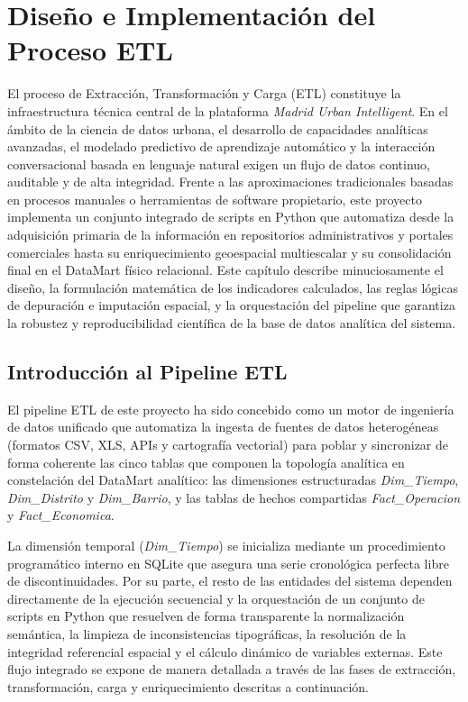\documentclass[a4paper,11pt,openany]{book}
\begin{document}
\chapter{Diseño e Implementación del Proceso ETL}
\label{chap:etl}
El proceso de Extracción, Transformación y Carga (ETL) constituye la infraestructura técnica central de la plataforma \textit{Madrid Urban Intelligent}. En el ámbito de la ciencia de datos urbana, el desarrollo de capacidades analíticas avanzadas, el modelado predictivo de aprendizaje automático y la interacción conversacional basada en lenguaje natural exigen un flujo de datos continuo, auditable y de alta integridad. Frente a las aproximaciones tradicionales basadas en procesos manuales o herramientas de software propietario, este proyecto implementa un conjunto integrado de scripts en Python que automatiza desde la adquisición primaria de la información en repositorios administrativos y portales comerciales hasta su enriquecimiento geoespacial multiescalar y su consolidación final en el DataMart físico relacional. Este capítulo describe minuciosamente el diseño, la formulación matemática de los indicadores calculados, las reglas lógicas de depuración e imputación espacial, y la orquestación del pipeline que garantiza la robustez y reproducibilidad científica de la base de datos analítica del sistema.

\section{Introducción al Pipeline ETL}
El pipeline ETL de este proyecto ha sido concebido como un motor de ingeniería de datos unificado que automatiza la ingesta de fuentes de datos heterogéneas (formatos CSV, XLS, APIs y cartografía vectorial) para poblar y sincronizar de forma coherente las cinco tablas que componen la topología analítica en constelación del DataMart analítico: las dimensiones estructuradas \textit{Dim\_Tiempo}, \textit{Dim\_Distrito} y \textit{Dim\_Barrio}, y las tablas de hechos compartidas \textit{Fact\_Operacion} y \textit{Fact\_Economica}. 

La dimensión temporal (\textit{Dim\_Tiempo}) se inicializa mediante un procedimiento programático interno en SQLite que asegura una serie cronológica perfecta libre de discontinuidades. Por su parte, el resto de las entidades del sistema dependen directamente de la ejecución secuencial y la orquestación de un conjunto de scripts en Python que resuelven de forma transparente la normalización semántica, la limpieza de inconsistencias tipográficas, la resolución de la integridad referencial espacial y el cálculo dinámico de variables externas. Este flujo integrado se expone de manera detallada a través de las fases de extracción, transformación, carga y enriquecimiento descritas a continuación.
\end{document}
